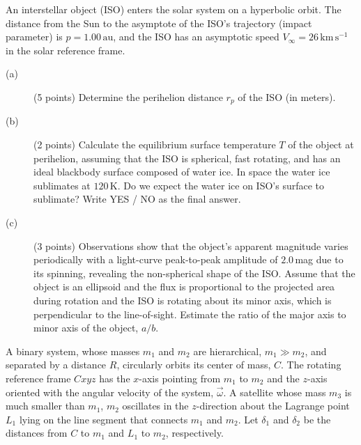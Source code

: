 An interstellar object (ISO) enters the solar system on a hyperbolic orbit.
The distance from the Sun to the asymptote of the ISO's trajectory (impact
parameter) is $p = 1.00\,\mathrm{au}$, and the ISO has an asymptotic speed
$V_\infty = 26\,\mathrm{km\,s^{-1}}$ in the solar reference frame.

\begin{description}
\item[(a)] (5 points) Determine the perihelion distance $r_p$ of the ISO (in
  meters).
\item[(b)] (2 points) Calculate the equilibrium surface temperature $T$ of
  the object at perihelion, assuming that the ISO is spherical, fast rotating,
  and has an ideal blackbody surface composed of water ice. In space the water
  ice sublimates at $120\,\mathrm{K}$. Do we expect the water ice on ISO's
  surface to sublimate? Write YES / NO as the final answer.
\item[(c)] (3 points) Observations show that the object's apparent magnitude
  varies periodically with a light-curve peak-to-peak amplitude of
  $2.0$\,mag due to its spinning, revealing the non-spherical shape of the
  ISO. Assume that the object is an ellipsoid and the flux is proportional to
  the projected area during rotation and the ISO is rotating about its minor
  axis, which is perpendicular to the line-of-sight. Estimate the ratio of the
  major axis to minor axis of the object, $a/b$.
\end{description}


A binary system, whose masses $m_1$ and $m_2$ are hierarchical,
$m_1 \gg m_2$, and separated by a distance $R$, circularly orbits its center
of mass, $C$. The rotating reference frame $Cxyz$ has the $x$-axis pointing
from $m_1$ to $m_2$ and the $z$-axis oriented with the angular velocity of
the system, $\vec{\omega}$. A satellite whose mass $m_3$ is much smaller than
$m_1$, $m_2$ oscillates in the $z$-direction about the Lagrange point $L_1$
lying on the line segment that connects $m_1$ and $m_2$. Let $\delta_1$ and
$\delta_2$ be the distances from $C$ to $m_1$ and $L_1$ to $m_2$,
respectively.


